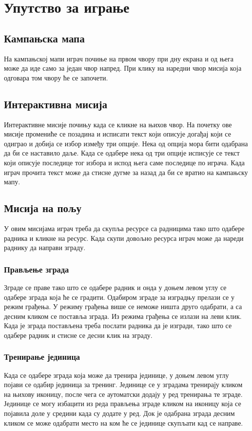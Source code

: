 \documentclass[11pt,a4paper]{report}
\begin{document}
\chapter{Упутство за играње}

\section{Кампањска мапа}
На кампањској мапи играч почиње на првом чвору при дну екрана и од њега може да иде само за један чвор напред. При клику на наредни чвор мисија која одговара том чвору ће се започети.

\section{Интерактивна мисија}
Интерактивне мисије почињу када се кликне на њихов чвор. На почетку ове мисије промениће се позадина и исписати текст који описује догађај који се одиграо и добија се избор између три опције. Нека од опција мора бити одабрана да би се  наставило даље. Када се одабере нека од три опције исписује се текст који описује последице тог избора и испод њега саме последице по играча. Када играч прочита текст може да стисне дугме за назад да би се вратио на кампањску мапу.

\section{Мисија на пољу}
У овим мисијама играч треба да скупља ресурсе са радницима тако што одабере радника и кликне на ресурс. Када скупи довољно ресурса играч може да нареди раднику да направи зграду. 

\subsection{Прављење зграда}
Зграде се праве тако што се одабере радник и онда у доњем левом углу се одабере зграда која ће се градити. Одабиром зграде за изградњу прелази се у режим грађења. У режиму грађења више се неможе ништа друго одабрати, а са десним кликом се поставља зграда. Из режима грађења се излази на леви клик. Када је зграда постављена треба послати радника да је изгради, тако што се одабере радник и стисне се десни клик на зграду. 

\subsection{Тренирање јединица}
Када се одабере зграда која може да тренира јединице, у доњем левом углу појави се одабир јединица за тренинг. Јединице се у зградама тренирају кликом на њихову иконицу, после чега се аутоматски додају у ред тренирања те зграде. Јединице се могу избацити из реда прављења зграде кликом на иконицу која се појавила доле у средини када су додате у ред. Док је одабрана зграда десним кликом се може одабрати место на ком ће се јединице скупљати кад се направе. 
\end{document}
